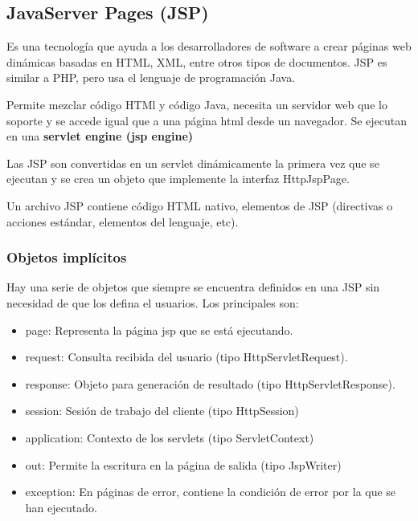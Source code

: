 \documentclass{apuntes}
\begin{document}
\subsection{JavaServer Pages (JSP)}
\begin{defn}[JSP]
Es una tecnología que ayuda a los desarrolladores de software a crear páginas web dinámicas basadas en HTML, XML, entre otros tipos de documentos. JSP es similar a PHP, pero usa el lenguaje de programación Java.
\end{defn}

Permite mezclar código HTMl y código Java, necesita un servidor web que lo soporte y se accede igual que a una página html desde un navegador. Se ejecutan en una \textbf{servlet engine (jsp engine)}

Las JSP son convertidas en un servlet dinámicamente la primera vez que se ejecutan y se crea un objeto que implemente la interfaz HttpJspPage.

Un archivo JSP contiene código HTML nativo, elementos de JSP (directivas o acciones estándar, elementos del lenguaje, etc).

\subsubsection{Objetos implícitos}
Hay una serie de objetos que siempre se encuentra definidos en una JSP sin necesidad de que los defina el usuarios. Los principales son:
\begin{itemize}
\item page: Representa la página jsp que se está ejecutando.
\item request: Consulta recibida del usuario (tipo HttpServletRequest).
\item response: Objeto para generación de resultado (tipo HttpServletResponse).
\item session: Sesión de trabajo del cliente (tipo HttpSession)
\item application: Contexto de los servlets (tipo ServletContext)
\item out: Permite la escritura en la página de salida (tipo JspWriter)
\item exception: En páginas de error, contiene la condición de error por la que se han ejecutado.
\end{itemize}
\end{document}
